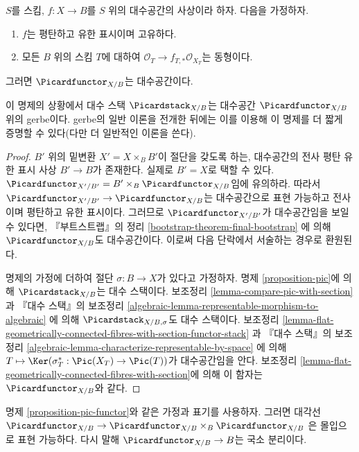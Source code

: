 \begin{proposition}
\label{proposition-pic-functor}
$S$를 스킴, $f : X \to B$를 $S$ 위의 대수공간의 사상이라 하자.
다음을 가정하자.
\begin{enumerate}
\item $f$는 평탄하고 유한 표시이며 고유하다.
\item 모든 $B$ 위의 스킴 $T$에 대하여
$\mathcal{O}_T \to f_{T, *}\mathcal{O}_{X_T}$는 동형이다.
\end{enumerate}
그러면 $\Picardfunctor_{X/B}$는 대수공간이다.
\end{proposition}

\noindent
이 명제의 상황에서 대수 스택 $\Picardstack_{X/B}$는 대수공간
$\Picardfunctor_{X/B}$ 위의 gerbe이다. gerbe의 일반 이론을 전개한 뒤에는
이를 이용해 이 명제를 더 짧게 증명할 수 있다(다만 더 일반적인 이론을 쓴다).

\begin{proof}
$B'$ 위의 밑변환 $X' = X \times_B B'$이 절단을 갖도록 하는, 대수공간의
전사 평탄 유한 표시 사상 $B' \to B$가 존재한다. 실제로 $B' = X$로
택할 수 있다. $\Picardfunctor_{X'/B'} = B' \times_B \Picardfunctor_{X/B}$임에
유의하라. 따라서 $\Picardfunctor_{X'/B'} \to \Picardfunctor_{X/B}$는
대수공간으로 표현 가능하고 전사이며 평탄하고 유한 표시이다.
그러므로 $\Picardfunctor_{X'/B'}$가 대수공간임을 보일 수 있다면,
『부트스트랩』의 정리
\ref{bootstrap-theorem-final-bootstrap}
에 의해 $\Picardfunctor_{X/B}$도 대수공간이다. 이로써 다음 단락에서
서술하는 경우로 환원된다.

\medskip\noindent
명제의 가정에 더하여 절단 $\sigma : B \to X$가 있다고 가정하자.
명제 \ref{proposition-pic}에 의해 $\Picardstack_{X/B}$는 대수 스택이다.
보조정리 \ref{lemma-compare-pic-with-section}과 『대수 스택』의 보조정리
\ref{algebraic-lemma-representable-morphism-to-algebraic}
에 의해 $\Picardstack_{X/B, \sigma}$도 대수 스택이다. 보조정리
\ref{lemma-flat-geometrically-connected-fibres-with-section-functor-stack}
과 『대수 스택』의 보조정리
\ref{algebraic-lemma-characterize-representable-by-space}
에 의해 $T \mapsto \Ker(\sigma_T^* : \Pic(X_T) \to \Pic(T))$가
대수공간임을 안다. 보조정리
\ref{lemma-flat-geometrically-connected-fibres-with-section}에 의해
이 함자는 $\Picardfunctor_{X/B}$와 같다.
\end{proof}

\begin{lemma}
\label{lemma-diagonal-pic}
명제 \ref{proposition-pic-functor}와 같은 가정과 표기를 사용하자. 그러면 대각선
$\Picardfunctor_{X/B} \to \Picardfunctor_{X/B} \times_B \Picardfunctor_{X/B}$
은 몰입으로 표현 가능하다. 다시 말해
$\Picardfunctor_{X/B} \to B$는 국소 분리이다.
\end{lemma}

